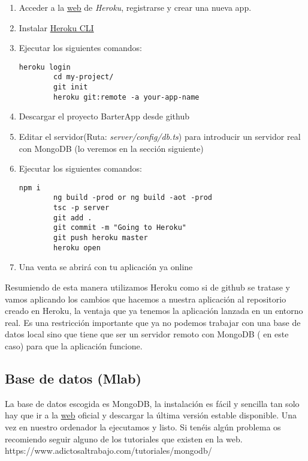 \begin{enumerate}
	\item Acceder a la \href{https://www.heroku.com/}{web} de \emph{Heroku}, registrarse y crear una nueva app.
	\item Instalar \href{https://devcenter.heroku.com/articles/heroku-cli}{Heroku CLI}
	\item Ejecutar los siguientes comandos:
		\lstset{language=C, breaklines=true, basicstyle=\footnotesize}
		\begin{lstlisting}[frame=single]
		heroku login
		cd my-project/
		git init
		heroku git:remote -a your-app-name
    	\end{lstlisting}
	\item Descargar el proyecto BarterApp desde github 
	\item Editar el servidor(Ruta: \emph{server/config/db.ts}) para introducir un servidor real con MongoDB (lo veremos en la sección siguiente)
	\item Ejecutar los siguientes comandos:
		\lstset{language=C, breaklines=true, basicstyle=\footnotesize}
		\begin{lstlisting}[frame=single]
		npm i
		ng build -prod or ng build -aot -prod
		tsc -p server
		git add .
		git commit -m "Going to Heroku"
		git push heroku master
		heroku open
    	\end{lstlisting}
	\item Una venta se abrirá con tu aplicación ya online
\end{enumerate}

Resumiendo de esta manera utilizamos Heroku como si de github se tratase y vamos aplicando los cambios que hacemos a nuestra aplicación al repositorio creado en Heroku, la ventaja que ya tenemos la aplicación lanzada en un entorno real. Es una restricción importante que ya no podemos trabajar con una base de datos local sino que tiene que ser un servidor remoto con MongoDB ( en este caso) para que la aplicación funcione.
	

\subsection{Base de datos (Mlab)}
La base de datos escogida es MongoDB, la instalación es fácil y sencilla tan solo hay que ir a la \href{http://www.mongodb.org/downloads}{web} oficial y descargar la última versión estable disponible. Una vez en nuestro ordenador la ejecutamos y listo.  Si tenéis algún problema os recomiendo seguir alguno de los tutoriales que existen en la web. https://www.adictosaltrabajo.com/tutoriales/mongodb/

